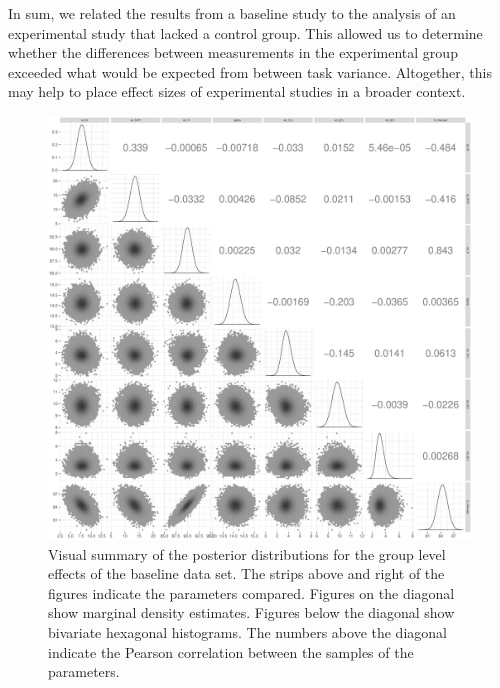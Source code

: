 \documentclass[a4paper]{article}
\begin{document}
In sum, we related the results from a baseline study to the analysis of an experimental study that lacked a control group. This allowed us to determine whether the differences between measurements in the experimental group exceeded what would be expected from between task variance. Altogether, this may help to place effect sizes of experimental studies in a broader context.





\newpage


\begin{figure}[!ht]
	\includegraphics[width=\textwidth]{figures/baselinePosteriorDescriptivesPlot.pdf}
	\caption{Visual summary of the posterior distributions for the group level effects of the baseline data set. The strips above and right of the figures indicate the parameters compared. Figures on the diagonal show marginal density estimates. Figures below the diagonal show bivariate hexagonal histograms. The numbers above the diagonal indicate the Pearson correlation between the samples of the parameters.}
	\label{fig:baselinePosteriorDescriptives}
\end{figure}
\end{document}
